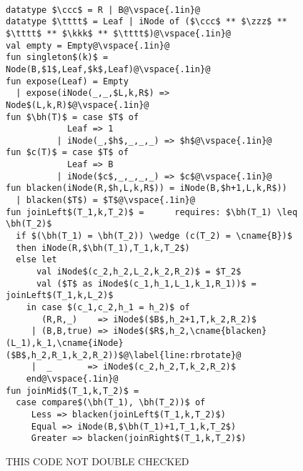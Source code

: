 \begin{figure}
\begin{datastructure}~
\label{ds:redblack}
\begin{lstlisting}
datatype $\ccc$ = R | B@\vspace{.1in}@
datatype $\tttt$ = Leaf | iNode of ($\ccc$ ** $\zzz$ ** $\tttt$ ** $\kkk$ ** $\tttt$)@\vspace{.1in}@
val empty = Empty@\vspace{.1in}@
fun singleton$(k)$ = Node(B,$1$,Leaf,$k$,Leaf)@\vspace{.1in}@
fun expose(Leaf) = Empty
  | expose(iNode(_,_,$L,k,R$) => Node$(L,k,R)$@\vspace{.1in}@
fun $\bh(T)$ = case $T$ of 
            Leaf => 1
          | iNode(_,$h$,_,_,_) => $h$@\vspace{.1in}@
fun $c(T)$ = case $T$ of 
            Leaf => B
          | iNode($c$,_,_,_,_) => $c$@\vspace{.1in}@
fun blacken(iNode(R,$h,L,k,R$)) = iNode(B,$h+1,L,k,R$))
  | blacken($T$) = $T$@\vspace{.1in}@
fun joinLeft$(T_1,k,T_2)$ =      requires: $\bh(T_1) \leq \bh(T_2)$
  if $(\bh(T_1) = \bh(T_2)) \wedge (c(T_2) = \cname{B})$
  then iNode(R,$\bh(T_1),T_1,k,T_2$)
  else let 
      val iNode$(c_2,h_2,L_2,k_2,R_2)$ = $T_2$
      val ($T$ as iNode$(c_1,h_1,L_1,k_1,R_1))$ = joinLeft$(T_1,k,L_2)$
    in case $(c_1,c_2,h_1 = h_2)$ of
       (R,R,_)    => iNode$($B$,h_2+1,T,k_2,R_2)$
     | (B,B,true) => iNode$($R$,h_2,\cname{blacken}(L_1),k_1,\cname{iNode}($B$,h_2,R_1,k_2,R_2))$@\label{line:rbrotate}@
     |  _       => iNode$(c_2,h_2,T,k_2,R_2)$
    end@\vspace{.1in}@
fun joinMid$(T_1,k,T_2)$ =
  case compare$(\bh(T_1), \bh(T_2))$ of
     Less => blacken(joinLeft$(T_1,k,T_2)$)
     Equal => iNode(B,$\bh(T_1)+1,T_1,k,T_2$)
     Greater => blacken(joinRight$(T_1,k,T_2)$)
\end{lstlisting}
THIS CODE NOT DOUBLE CHECKED
\end{datastructure}
\end{figure}

\begin{comment}
Another version of joinLeft---much longer
\begin{lstlisting}
fun joinLeft$(T_1,k,T_2)$ =      requires: $h(T_1) \leq h(T_2)$
  if $h(T_1) = h(T_2)$
  then Node(R,$h(T_1),T_1,k,T_2$)
  else let 
      val Node$(c_2,h_2,L_2,k_2,R_2)$ = $T_2$
       in case $c(L_2)$ of
         R => (case joinLeftR$(T_1,k,L_2)$ of
                 Node(B,$h_1,L_1,k_1,R_1)$ =>
                   Node$($R$,h_2,\cname{blacken}(L_1),k_1,\cname{Node}($B$,h_2,R_1,k_2,R_2))$@\label{line:rbrotate}@
               | $T$ => Node$($B$,h_2,T,k_2,R_2)$)
        | B => NODE(B,$h_2,\cname{joinLeft}(T_1,k,L_2),k_2,R_2$)
and joinLeftR$(T_1,k,T_2)$ =
  let val Node$(c_2,h_2,L_2,k_2,R_2)$ = $T_2$
  in let val $T$ = joinLeft$(T_1,k,L_2)$
     in case $c(T)$ of
       R => Node$($B$,h_2+1,T,k_2,R_2)$
     | B => Node$($R$,h_2,T,k_2,R_2)$@\vspace{.1in}@
\end{lstlisting}
\end{comment}

